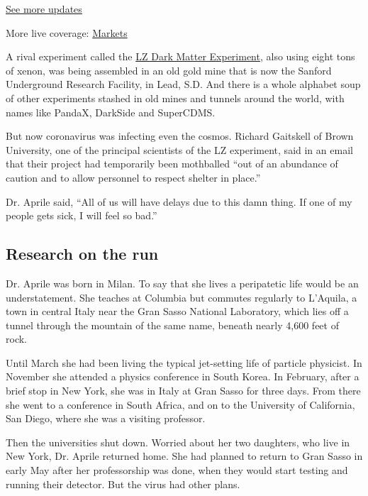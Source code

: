 \href{https://www.nytimes3xbfgragh.onion/2020/09/09/world/covid-19-coronavirus.html?action=click\&pgtype=Article\&state=default\&region=MAIN_CONTENT_1\&context=storylines_live_updates}{See
more updates}

More live coverage:
\href{https://www.nytimes3xbfgragh.onion/live/2020/09/09/business/stock-market-today-coronavirus?action=click\&pgtype=Article\&state=default\&region=MAIN_CONTENT_1\&context=storylines_live_updates}{Markets}

A rival experiment called the \href{https://lz.lbl.gov/}{LZ Dark Matter
Experiment}, also using eight tons of xenon, was being assembled in an
old gold mine that is now the Sanford Underground Research Facility, in
Lead, S.D. And there is a whole alphabet soup of other experiments
stashed in old mines and tunnels around the world, with names like
PandaX, DarkSide and SuperCDMS.

But now coronavirus was infecting even the cosmos. Richard Gaitskell of
Brown University, one of the principal scientists of the LZ experiment,
said in an email that their project had temporarily been mothballed
``out of an abundance of caution and to allow personnel to respect
shelter in place.''

Dr. Aprile said, ``All of us will have delays due to this damn thing. If
one of my people gets sick, I will feel so bad.''

\hypertarget{research-on-the-run}{%
\subsection{Research on the run}\label{research-on-the-run}}

Dr. Aprile was born in Milan. To say that she lives a peripatetic life
would be an understatement. She teaches at Columbia but commutes
regularly to L'Aquila, a town in central Italy near the Gran Sasso
National Laboratory, which lies off a tunnel through the mountain of the
same name, beneath nearly 4,600 feet of rock.

Until March she had been living the typical jet-setting life of particle
physicist. In November she attended a physics conference in South Korea.
In February, after a brief stop in New York, she was in Italy at Gran
Sasso for three days. From there she went to a conference in South
Africa, and on to the University of California, San Diego, where she was
a visiting professor.

Then the universities shut down. Worried about her two daughters, who
live in New York, Dr. Aprile returned home. She had planned to return to
Gran Sasso in early May after her professorship was done, when they
would start testing and running their detector. But the virus had other
plans.

